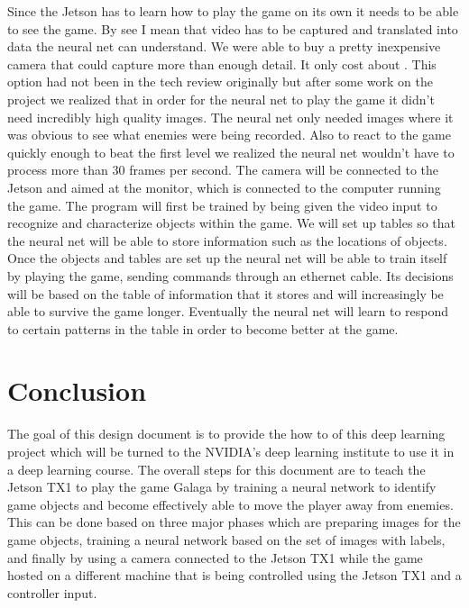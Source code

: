\documentclass[onecolumn, draftclsnofoot,10pt, compsoc]{IEEEtran}
\begin{document}
Since the Jetson has to learn how to play the game on its own it needs to be able to see the game.
By see I mean that video has to be captured and translated into data the neural net can understand.
We were able to buy a pretty inexpensive camera that could capture more than enough detail.
It only cost about .
This option had not been in the tech review originally but after some work on the project we realized that in order for the neural net to play the game it didn't need incredibly high quality images.
The neural net only needed images where it was obvious to see what enemies were being recorded.
Also to react to the game quickly enough to beat the first level we realized the neural net wouldn't have to process more than 30 frames per second.
The camera will be connected to the Jetson and aimed at the monitor, which is connected to the computer running the game.
The program will first be trained by being given the video input to recognize and characterize objects within the game.
We will set up tables so that the neural net will be able to store information such as the locations of objects.
Once the objects and tables are set up the neural net will be able to train itself by playing the game, sending commands through an ethernet cable.
Its decisions will be based on the table of information that it stores and will increasingly be able to survive the game longer.
Eventually the neural net will learn to respond to certain patterns in the table in order to become better at the game.

\section{Conclusion}
The goal of this design document is to provide the how to of this deep learning project which will be turned to the NVIDIA's deep learning institute to use it in a deep learning course.
The overall steps for this document are to teach the Jetson TX1 to play the game Galaga by training a neural network to identify game objects and become effectively able to move the player away from enemies.
This can be done based on three major phases which are preparing images for the game objects, training a neural network based on the set of images with labels, and finally by using a camera connected to the Jetson TX1 while the game hosted on a different machine that is being controlled using the Jetson TX1 and a controller input.
\end{document}

